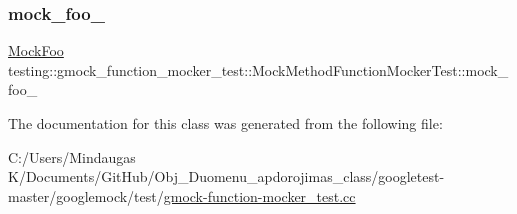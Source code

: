 \subsubsection{\texorpdfstring{mock\_foo\_}{mock\_foo\_}}
{\footnotesize\ttfamily \mbox{\hyperlink{classtesting_1_1gmock__function__mocker__test_1_1_mock_foo}{Mock\+Foo}} testing\+::gmock\+\_\+function\+\_\+mocker\+\_\+test\+::\+Mock\+Method\+Function\+Mocker\+Test\+::mock\+\_\+foo\+\_\+\hspace{0.3cm}{\ttfamily [protected]}}



The documentation for this class was generated from the following file\+:\begin{DoxyCompactItemize}
\item 
C\+:/\+Users/\+Mindaugas K/\+Documents/\+Git\+Hub/\+Obj\+\_\+\+Duomenu\+\_\+apdorojimas\+\_\+class/googletest-\/master/googlemock/test/\mbox{\hyperlink{googletest-master_2googlemock_2test_2gmock-function-mocker__test_8cc}{gmock-\/function-\/mocker\+\_\+test.\+cc}}\end{DoxyCompactItemize}
